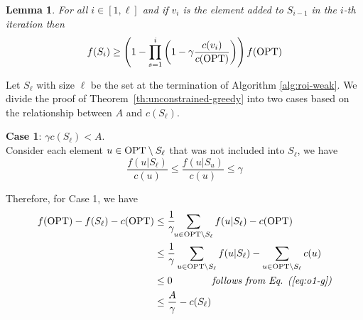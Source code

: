 \documentclass[10pt]{article} %
\newtheorem{lemma}[theorem]{Lemma}
\theoremstyle{remark}
\newcommand{\OPT}{{\rm OPT}}
\begin{document}
\begin{lemma}
\label{lem:f-Si-g}
For all $i\in [1,\ell]$ and if $v_i$ is the element added to $S_{i-1}$ in the $i$-th iteration then
\begin{equation}
    \label{eq:f-Si-g}
    f(S_{i}) \geq \left(1- \prod_{s=1}^{i} \left(1- \gamma \frac{c(v_i)}{c(\OPT)} \right)   \right) f(\OPT)
\end{equation}

\end{lemma}






Let $S_\ell$ with size $\ell$ be the set at the termination of Algorithm \ref{alg:roi-weak}. We divide the proof of Theorem~\ref{th:unconstrained-greedy} into two cases based on the relationship between $A$ and $c(S_\ell)$. 

    \textbf{Case 1}: $\gamma c(S_\ell) < A$.\\
    Consider each element $u \in \OPT \setminus S_\ell$ that was not included into $S_\ell$, we have
    \begin{equation}
    \label{eq:o1-g}
        \frac{f(u|S_\ell)}{c(u)} \leq \frac{f(u|S_u)}{c(u)} \leq \gamma
    \end{equation}
        
    Therefore, for Case 1, we have
    \begin{align*}
        f(\OPT)-f(S_\ell)-c(\OPT) &\leq \frac{1}{\gamma}\!\!\sum_{u \in \OPT \setminus S_{\ell}} f(u|S_\ell)-c(\OPT)\\
        &\leq \frac{1}{\gamma}\sum_{u \in \OPT \setminus S_{\ell}} f(u|S_\ell)-\sum_{u \in \OPT \setminus S_{\ell}} c(u) \\
        &\leq 0 \quad \quad\quad \quad \mbox{\it follows from  Eq. (\ref{eq:o1-g})}\\
        &\leq \frac{A}{\gamma}-c(S_\ell)
    \end{align*}
\end{document}

